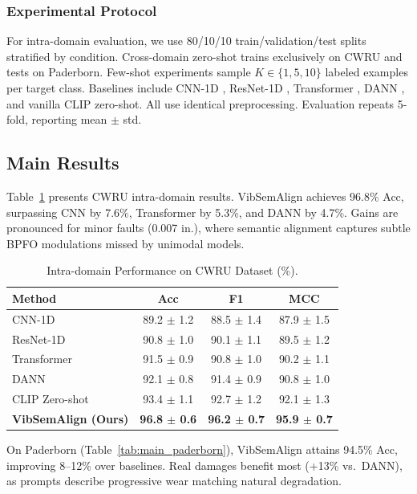 \subsubsection{Experimental Protocol}
For intra-domain evaluation, we use 80/10/10 train/validation/test splits stratified by condition. Cross-domain zero-shot trains exclusively on CWRU and tests on Paderborn. Few-shot experiments sample $K \in \{1, 5, 10\}$ labeled examples per target class. Baselines include CNN-1D \cite{cite4}, ResNet-1D \cite{cite5}, Transformer \cite{cite32}, DANN \cite{cite30}, and vanilla CLIP zero-shot. All use identical preprocessing. Evaluation repeats 5-fold, reporting mean $\pm$ std.

\subsection{Main Results}

Table~\ref{tab:main_cwru} presents CWRU intra-domain results. VibSemAlign achieves 96.8\% Acc, surpassing CNN by 7.6\%, Transformer by 5.3\%, and DANN by 4.7\%. Gains are pronounced for minor faults (0.007 in.), where semantic alignment captures subtle BPFO modulations missed by unimodal models.

\begin{table}[t]
\centering
\caption{Intra-domain Performance on CWRU Dataset (\%).}
\label{tab:main_cwru}
\begin{tabular}{@{}lccc@{}}
\toprule
Method & Acc & F1 & MCC \\
\midrule
CNN-1D \cite{cite4} & 89.2 $\pm$ 1.2 & 88.5 $\pm$ 1.4 & 87.9 $\pm$ 1.5 \\
ResNet-1D \cite{cite5} & 90.8 $\pm$ 1.0 & 90.1 $\pm$ 1.1 & 89.5 $\pm$ 1.2 \\
Transformer \cite{cite32} & 91.5 $\pm$ 0.9 & 90.8 $\pm$ 1.0 & 90.2 $\pm$ 1.1 \\
DANN \cite{cite30} & 92.1 $\pm$ 0.8 & 91.4 $\pm$ 0.9 & 90.8 $\pm$ 1.0 \\
CLIP Zero-shot & 93.4 $\pm$ 1.1 & 92.7 $\pm$ 1.2 & 92.1 $\pm$ 1.3 \\
\midrule
\textbf{VibSemAlign (Ours)} & \textbf{96.8 $\pm$ 0.6} & \textbf{96.2 $\pm$ 0.7} & \textbf{95.9 $\pm$ 0.7} \\
\bottomrule
\end{tabular}
\end{table}

On Paderborn (Table~\ref{tab:main_paderborn}), VibSemAlign attains 94.5\% Acc, improving 8--12\% over baselines. Real damages benefit most (+13\% vs.\ DANN), as prompts describe progressive wear matching natural degradation.

